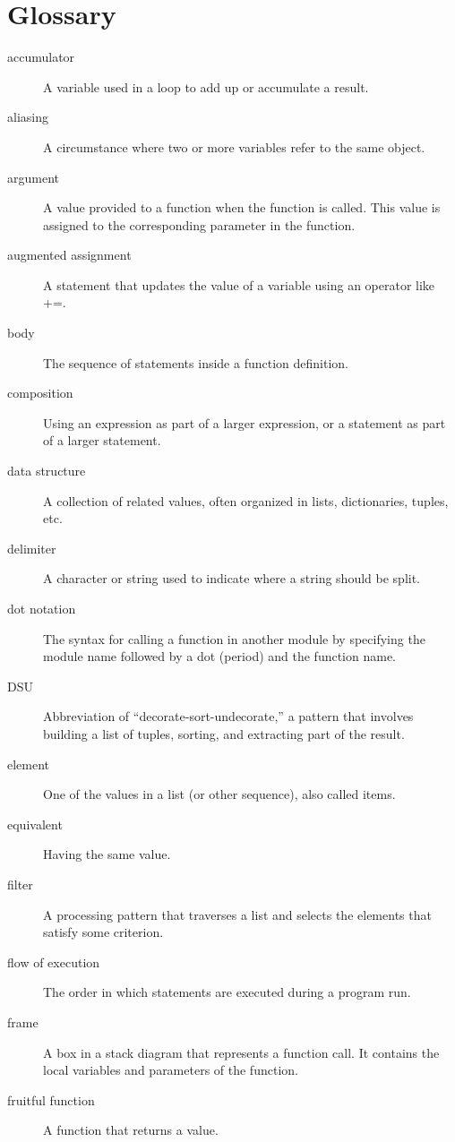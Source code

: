 \documentclass{article}
\begin{document}
\section*{Glossary}
\begin{description}
\item [accumulator] A variable used in a loop to add up or accumulate a result.
\item [aliasing] A circumstance where two or more variables refer to the same object.
\item [argument] A value provided to a function when the function is
    called. This value is assigned to the corresponding parameter in
    the function.

\item [augmented assignment] A statement that updates the value of a variable using an operator like +=.
\item [body] The sequence of statements inside a function definition.
\item [composition] Using an expression as part of a larger
    expression, or a statement as part of a larger statement.
\item [data structure] A collection of related values, often organized
    in lists, dictionaries, tuples, etc.
\item [delimiter] A character or string used to indicate where a string should be split.
\item [dot notation] The syntax for calling a function in another
    module by specifying the module name followed by a dot (period)
    and the function name.
\item [DSU] Abbreviation of ``decorate-sort-undecorate,'' a pattern that
    involves building a list of tuples, sorting, and extracting part
    of the result.
\item [element] One of the values in a list (or other sequence), also called items.
\item [equivalent] Having the same value.
\item [filter] A processing pattern that traverses a list and selects the elements that satisfy some criterion.
\item [flow of execution] The order in which statements are executed
    during a program run.
\item [frame] A box in a stack diagram that represents a function
    call. It contains the local variables and parameters of the
    function.
\item [fruitful function] A function that returns a value.

\end{description}
\end{document}

